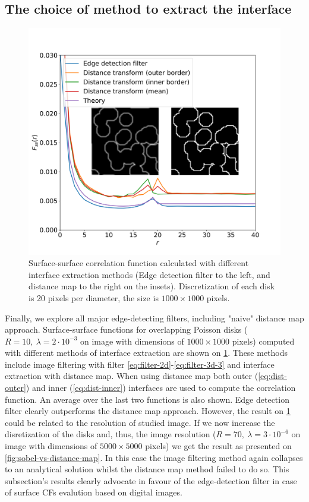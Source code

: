 \documentclass[reprint,amsmath,amssymb,aps,pre,showkeys,showpacs]{revtex4-1}
\begin{document}
\subsection{The choice of method to extract the interface}
\begin{figure}[ht]
  \centering
  \includegraphics[width=\linewidth]{images/dm_sobel.png}
  \caption{Surface-surface correlation function calculated with different
    interface extraction methods (Edge detection filter to the left, and
    distance map to the right on the insets). Discretization of each disk is 20
    pixels per diameter, the size is $1000 \times 1000$ pixels.}
  \label{fig:interface-extraction}
\end{figure}

Finally, we explore all major edge-detecting filters, including "naive" distance
map approach. Surface-surface functions for overlapping Poisson disks
($R = 10,\ \lambda = 2 \cdot 10^{-3}$ on image with dimensions of $1000 \times 1000$
pixels) computed with different methods of interface extraction are shown on
\cref{fig:interface-extraction}. These methods include image filtering with
filter \cref{eq:filter-2d}-\cref{eq:filter-3d-3} and interface extraction with
distance map. When using distance map both outer (\cref{eq:dist-outer}) and
inner (\cref{eq:dist-inner}) interfaces are used to compute the correlation
function. An average over the last two functions is also shown. Edge detection
filter clearly outperforms the distance map approach. However, the result on
\cref{fig:interface-extraction} could be related to the resolution of studied
image. If we now increase the disretization of the disks and, thus, the image
resolution ($R = 70,\ \lambda = 3 \cdot 10^{-6}$ on image with dimensions of
$5000 \times 5000$ pixels) we get the result as presented on
\cref{fig:sobel-vs-distance-map}. In this case the image filtering method again
collapses to an analytical solution whilst the distance map method failed to do
so. This subsection's results clearly advocate in favour of the edge-detection
filter in case of surface CFs evalution based on digital images.
\end{document}
